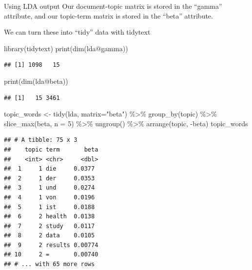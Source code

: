 \documentclass[
  10pt,
  ignorenonframetext,
  aspectratio=169]{beamer}
\newenvironment{Shaded}{\begin{snugshade}}{\end{snugshade}}
\newcommand{\AttributeTok}[1]{\textcolor[rgb]{0.80,0.80,0.80}{#1}}
\newcommand{\DecValTok}[1]{\textcolor[rgb]{0.86,0.86,0.80}{#1}}
\newcommand{\FunctionTok}[1]{\textcolor[rgb]{0.94,0.94,0.56}{#1}}
\newcommand{\NormalTok}[1]{\textcolor[rgb]{0.80,0.80,0.80}{#1}}
\newcommand{\OtherTok}[1]{\textcolor[rgb]{0.94,0.94,0.56}{#1}}
\newcommand{\SpecialCharTok}[1]{\textcolor[rgb]{0.86,0.64,0.64}{#1}}
\newcommand{\StringTok}[1]{\textcolor[rgb]{0.80,0.58,0.58}{#1}}
\begin{document}
\begin{frame}[fragile]{Using LDA output}
\protect\hypertarget{using-lda-output}{}
Our document-topic matrix is stored in the ``gamma'' attribute, and our
topic-term matrix is stored in the ``beta'' attribute.

We can turn these into ``tidy'' data with tidytext

\medskip
\scriptsize

\begin{Shaded}
\begin{Highlighting}[]
\FunctionTok{library}\NormalTok{(tidytext)}
\FunctionTok{print}\NormalTok{(}\FunctionTok{dim}\NormalTok{(lda}\SpecialCharTok{@}\NormalTok{gamma))}
\end{Highlighting}
\end{Shaded}

\begin{verbatim}
## [1] 1098   15
\end{verbatim}

\begin{Shaded}
\begin{Highlighting}[]
\FunctionTok{print}\NormalTok{(}\FunctionTok{dim}\NormalTok{(lda}\SpecialCharTok{@}\NormalTok{beta))}
\end{Highlighting}
\end{Shaded}

\begin{verbatim}
## [1]   15 3461
\end{verbatim}

\begin{Shaded}
\begin{Highlighting}[]
\NormalTok{topic\_words }\OtherTok{\textless{}{-}} \FunctionTok{tidy}\NormalTok{(lda, }\AttributeTok{matrix=}\StringTok{"beta"}\NormalTok{) }\SpecialCharTok{\%\textgreater{}\%}
  \FunctionTok{group\_by}\NormalTok{(topic) }\SpecialCharTok{\%\textgreater{}\%}
  \FunctionTok{slice\_max}\NormalTok{(beta, }\AttributeTok{n =} \DecValTok{5}\NormalTok{) }\SpecialCharTok{\%\textgreater{}\%} 
  \FunctionTok{ungroup}\NormalTok{() }\SpecialCharTok{\%\textgreater{}\%}
  \FunctionTok{arrange}\NormalTok{(topic, }\SpecialCharTok{{-}}\NormalTok{beta)}
\NormalTok{topic\_words}
\end{Highlighting}
\end{Shaded}

\begin{verbatim}
## # A tibble: 75 x 3
##    topic term       beta
##    <int> <chr>     <dbl>
##  1     1 die     0.0377 
##  2     1 der     0.0353 
##  3     1 und     0.0274 
##  4     1 von     0.0196 
##  5     1 ist     0.0188 
##  6     2 health  0.0138 
##  7     2 study   0.0117 
##  8     2 data    0.0105 
##  9     2 results 0.00774
## 10     2 =       0.00740
## # ... with 65 more rows
\end{verbatim}
\end{frame}
\end{document}
